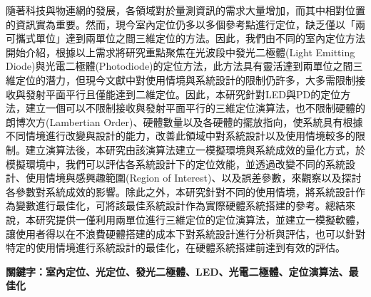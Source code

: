 \begin{abstractCH}

  隨著科技與物連網的發展，各領域對於量測資訊的需求大量增加，而其中相對位置的資訊實為重要。然而，現今室內定位仍多以多個參考點進行定位，缺乏僅以「兩可攜式單位」達到兩單位之間三維定位的方法。因此，我們由不同的室內定位方法開始介紹，根據以上需求將研究重點聚焦在光波段中發光二極體(Light Emitting Diode)與光電二極體(Photodiode)的定位方法，此方法具有靈活達到兩單位之間三維定位的潛力，但現今文獻中對使用情境與系統設計的限制仍許多，大多需限制接收與發射平面平行且僅能達到二維定位。因此，本研究針對LED與PD的定位方法，建立一個可以不限制接收與發射平面平行的三維定位演算法，也不限制硬體的朗博次方(Lambertian Order)、硬體數量以及各硬體的擺放指向，使系統具有根據不同情境進行改變與設計的能力，改善此領域中對系統設計以及使用情境較多的限制。建立演算法後，本研究由該演算法建立一模擬環境與系統成效的量化方式，於模擬環境中，我們可以評估各系統設計下的定位效能，並透過改變不同的系統設計、使用情境與感興趣範圍(Region of Interest)、以及誤差參數，來觀察以及探討各參數對系統成效的影響。除此之外，本研究針對不同的使用情境，將系統設計作為變數進行最佳化，可將該最佳系統設計作為實際硬體系統搭建的參考。總結來說，本研究提供一僅利用兩單位進行三維定位的定位演算法，並建立一模擬軟體，讓使用者得以在不浪費硬體搭建的成本下對系統設計進行分析與評估，也可以針對特定的使用情境進行系統設計的最佳化，在硬體系統搭建前達到有效的評估。


  \vspace{1cm}
  \noindent \textbf{關鍵字：室內定位、光定位、發光二極體、LED、光電二極體、定位演算法、最佳化}

\end{abstractCH}
